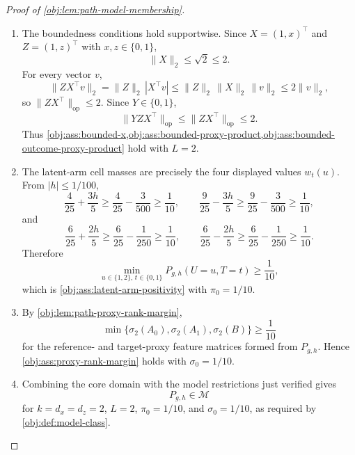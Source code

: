\documentclass[11pt]{article}
\begin{document}
\begin{proof}[Proof of \cref{obj:lem:path-model-membership}]
\begin{enumerate}
\item The boundedness conditions hold supportwise.  Since \(X=(1,x)^\top\) and \(Z=(1,z)^\top\) with \(x,z\in\{0,1\}\),
\[
\|X\|_2\le\sqrt2\le2.
\]
For every vector \(v\),
\[
\|ZX^\top v\|_2
=
\|Z\|_2\,|X^\top v|
\le
\|Z\|_2\,\|X\|_2\,\|v\|_2
\le
2\|v\|_2,
\]
so \(\|ZX^\top\|_{\mathrm{op}}\le2\).  Since \(Y\in\{0,1\}\),
\[
\|YZX^\top\|_{\mathrm{op}}\le \|ZX^\top\|_{\mathrm{op}}\le2 .
\]
Thus \cref{obj:ass:bounded-x,obj:ass:bounded-proxy-product,obj:ass:bounded-outcome-proxy-product} hold with \(L=2\). %

\item The latent-arm cell masses are precisely the four displayed values \(w_t(u)\).  From \(|h|\le1/100\),
\[
\frac4{25}+\frac{3h}{5}\ge\frac4{25}-\frac3{500}\ge\frac1{10},\qquad
\frac9{25}-\frac{3h}{5}\ge\frac9{25}-\frac3{500}\ge\frac1{10},
\]
and
\[
\frac6{25}+\frac{2h}{5}\ge\frac6{25}-\frac1{250}\ge\frac1{10},\qquad
\frac6{25}-\frac{2h}{5}\ge\frac6{25}-\frac1{250}\ge\frac1{10}.
\]
Therefore
\[
\min_{u\in\{1,2\},\,t\in\{0,1\}}
P_{g,h}(U=u,T=t)
\ge
\frac1{10},
\]
which is \cref{obj:ass:latent-arm-positivity} with \(\pi_0=1/10\). %

\item By \cref{obj:lem:path-proxy-rank-margin},
\[
\min\{\sigma_2(A_0),\sigma_2(A_1),\sigma_2(B)\}\ge\frac1{10}
\]
for the reference- and target-proxy feature matrices formed from \(P_{g,h}\).  Hence \cref{obj:ass:proxy-rank-margin} holds with \(\sigma_0=1/10\). %

\item Combining the core domain with the model restrictions just verified gives
\[
P_{g,h}\in\mathcal M
\]
for \(k=d_x=d_z=2\), \(L=2\), \(\pi_0=1/10\), and \(\sigma_0=1/10\), as required by \cref{obj:def:model-class}. %
\end{enumerate}
\end{proof}
\end{document}

